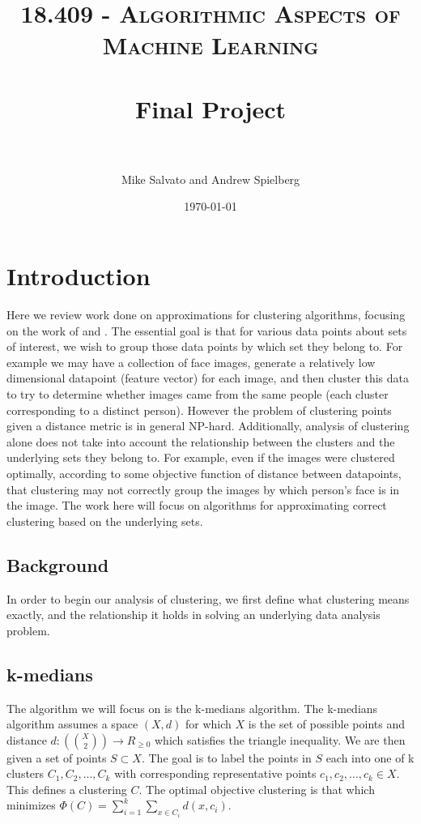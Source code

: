 \documentclass[paper=a4, fontsize=10.5pt]{scrartcl} %
\title{	
\normalfont \normalsize 
\textsc{18.409 - Algorithmic Aspects of Machine Learning} \\ [25pt] %
\horrule{0.5pt} \\[0.4cm] %
\huge Final Project \\ %
\horrule{2pt} \\[0.5cm] %
}
\author{Mike Salvato and Andrew Spielberg} %
\date{\normalsize\today} %
\numberwithin{equation}{section} %
\numberwithin{figure}{section} %
\numberwithin{table}{section} %
\begin{document}
\maketitle %

\section{Introduction}

Here we review work done on approximations for clustering algorithms, focusing on the work of \cite{firstpaper} and \cite{secondpaper}. The essential goal is that for various data points about sets of interest, we wish to group those data points by which set they belong to. For example we may have a collection of face images, generate a relatively low dimensional datapoint (feature vector) for each image, and then cluster this data to try to determine whether images came from the same people (each cluster corresponding to a distinct person). However the problem of clustering points given a distance metric is in general NP-hard. Additionally, analysis of clustering alone does not take into account the relationship between the clusters and the underlying sets they belong to. For example, even if the images were clustered optimally, according to some objective function of distance between datapoints, that clustering may not correctly group the images by which person's face is in the image. The work here will focus on algorithms for approximating correct clustering based on the underlying sets.

\subsection{Background}

In order to begin our analysis of clustering, we first define what clustering means exactly, and the relationship it holds in solving an underlying data analysis problem. 

\subsection{k-medians}
The algorithm we will focus on is the k-medians algorithm. The k-medians algorithm assumes a space $(X, d)$ for which $X$ is the set of possible points and distance $d : ({ X \choose 2}) \rightarrow R_{\geq 0}$ which satisfies the triangle inequality. We are then given a set of points $S \subset X$. The goal is to label the points in $S$ each into one of k clusters $C_1, C_2, ..., C_k$ with corresponding representative points $c_1, c_2, ..., c_k \in X$. This defines a clustering $C$. The optimal objective clustering is that which minimizes $\Phi(C) = \sum\limits_{i = 1}^k \sum_{x \in C_i} d(x, c_i)$.
\end{document}
